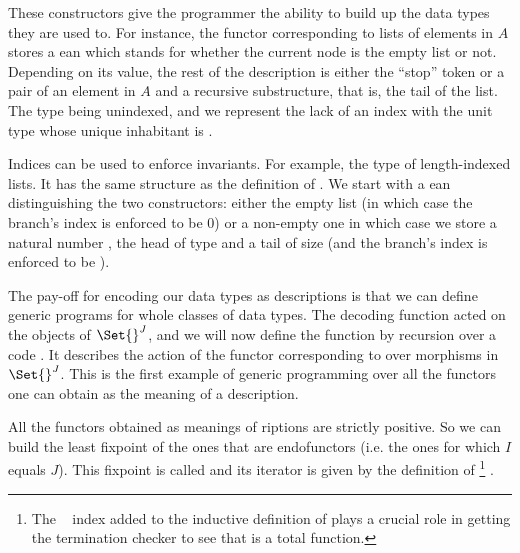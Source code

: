 These constructors give the programmer the ability to build up the data
types they are used to. For instance, the functor corresponding
to lists of elements in $A$ stores a ean which stands for whether
the current node is the empty list or not. Depending on its value, the
rest of the description is either the ``stop'' token or a pair of an element
in $A$ and a recursive substructure, that is, the tail of the list. The  type
being unindexed, and we represent the lack of an index with the unit type \AD{$\top$}
whose unique inhabitant is .

\begin{center}
\end{center}

Indices can be used to enforce invariants. For example, the type {  }
of length-indexed lists. It has the same structure as the definition of .
We start with a ean distinguishing the two constructors: either
the empty list (in which case the branch's index is enforced to be $0$) or a
non-empty one in which case we store a natural number , the head of type
 and a tail of size  (and the branch's index is enforced to be
 ).

\begin{center}
\end{center}

The pay-off for encoding our data types as descriptions is that we can define
generic programs for whole classes of data types. The decoding function 
acted on the objects of $\Set{}^J$, and we will now define the function  by
recursion over a code . It describes the action of the functor corresponding
to  over morphisms in $\Set{}^J$. This is the first example of generic
programming over all the functors one can obtain as the meaning of a description.

\begin{center}
\end{center}

All the functors obtained as meanings of riptions are strictly
positive. So we can build the least fixpoint of the ones that are endofunctors
(i.e. the ones for which $I$ equals $J$). This fixpoint is called 
and its iterator is given by the definition of  %
\footnote{The ~\cite{DBLP:journals/corr/abs-1012-4896} index added
to the inductive definition of  plays a crucial role in getting the
termination checker to see that  is a total function.
}
.

